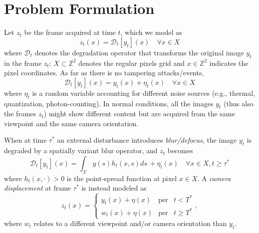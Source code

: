 \documentclass{llncs}
\begin{document}
\section{Problem Formulation}\label{sec:probForm}
%
Let $z_t$ be the frame acquired at time $t$, which we model as
\begin{equation}
\label{eq:observationModel}
z_t(x)=\mathcal{D}_t[y_t](x) \quad \forall x \in X
\end{equation}
where $\mathcal{D}_t$ denotes the degradation operator that transforms the original image $y_t$ in the frame $z_t$; $X \subset \mathbb{Z}^2$ denotes the regular pixels grid and $x\in \mathbb{Z}^2$ indicates the pixel coordinates. As far as there is no tampering attacks/events,
\begin{equation}
\label{eq:no_tampering}
\mathcal{D}_t[y_t](x) = y_t(x) + \eta_t(x) \quad \forall x \in X
\end{equation}
where $\eta_t$ is a random variable accounting for different noise sources (e.g., thermal, quantization, photon-counting). In normal conditions, all the images $y_t$ (thus also the frames $z_t$) might show different content but are acquired from the same viewpoint and the same camera orientation.

When at time $\tau^*$ an external disturbance introduces \emph{blur/defocus}, the image $y_t$ is degraded by a spatially variant blur operator, and $z_t$ becomes
\begin{equation}
\label{eq:model_defocus}
\mathcal{D}_t[y_t](x) = \int_{\mathcal{X}}y(s)h_t(x,s)ds\, + \eta_t(x) \quad \forall x \in X, t \geq \tau^*
\end{equation}
where $h_t(x,\cdot) > 0$ is the point-spread function at pixel $x \in X$.
%
A \emph{camera displacement} at frame $\tau^*$ is instead modeled as 
\begin{equation}
\label{eq:model_displacement}
z_t(x)  = \left\{ \begin{array}{rcl}
y_t(x) + \eta(x) & \mbox{per} & t < T^* \\
w_t(x) + \eta(x) & \mbox{per} & t \geqslant T^*
\end{array}\right. ,
\end{equation}
where $w_t$ relates to a different viewpoint and/or camera orientation than $y_t$. 
\end{document}
